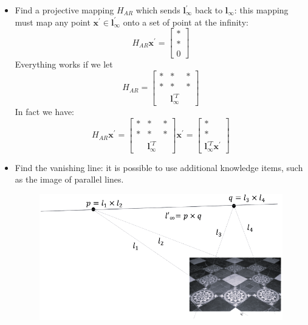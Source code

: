 \documentclass[12pt, a4paper]{report}
\newtheorem[style=M,bodystyle=\normalfont]{theorem}{Theorem}
\newtheorem[style=M,bodystyle=\normalfont]{corollary}{Corollary}
\newtheorem[style=M,bodystyle=\normalfont]{lemma}{Lemma}
\newtheorem[style=M,bodystyle=\normalfont]{definition}{Definition}
\begin{document}
    \begin{itemize}
        \item Find a projective mapping $H_{AR}$ which sends $\boldsymbol{l}^{'}_{\infty}$ back to $\boldsymbol{l}_{\infty}$: this mapping 
            must map any point $\boldsymbol{x}^{'} \in \boldsymbol{l}^{'}_{\infty}$ onto a set of point at the infinity: 
            \[H_{AR}\boldsymbol{x}^{'} = \begin{bmatrix} * \\ * \\ 0 \end{bmatrix}\]
            Everything works if we let \[H_{AR}=
            \begin{bmatrix}
                * & * & * \\
                * & * & * \\
                \: & \boldsymbol{l}^{'T}_{\infty} & \:
            \end{bmatrix}\]
            In fact we have: 
            \[H_{AR}\boldsymbol{x}^{'}=
            \begin{bmatrix}
                * & * & * \\
                * & * & * \\
                \: & \boldsymbol{l}^{'T}_{\infty} & \:
            \end{bmatrix}
            \boldsymbol{x}^{'}
            =
            \begin{bmatrix}
                * \\
                * \\
                \boldsymbol{l}^{'T}_{\infty}\boldsymbol{x}^{'}
            \end{bmatrix}
            \]
        \item Find the vanishing line: it is possible to use additional knowledge items, such as the image of parallel lines. 
            \begin{figure}[H]
                \centering
                \includegraphics[width=0.5\linewidth]{images/van.png}
            \end{figure}
    \end{itemize}
\end{document}

